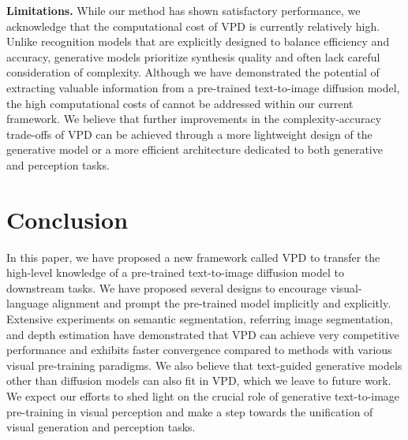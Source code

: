 \documentclass[10pt,twocolumn,letterpaper]{article}
\newcommand{\epstheta}{}
\newcommand{\paragrapha}[2][4pt]{\vspace{#1}\noindent\textbf{#2}}
\begin{document}
\paragrapha{Limitations. } While our method has shown satisfactory performance, we acknowledge that the computational cost of VPD is currently relatively high. Unlike recognition models that are explicitly designed to balance efficiency and accuracy, generative models prioritize synthesis quality and often lack careful consideration of complexity. Although we have demonstrated the potential of extracting valuable information from a pre-trained text-to-image diffusion model, the high computational costs of \epstheta{} cannot be addressed within our current framework. We believe that further improvements in the complexity-accuracy trade-offs of VPD can be achieved through a more lightweight design of the generative model or a more efficient architecture dedicated to both generative and perception tasks.



\section{Conclusion}
In this paper, we have proposed a new framework called VPD to transfer the high-level knowledge of a pre-trained text-to-image diffusion model to downstream tasks. We have proposed several designs to encourage visual-language alignment and prompt the pre-trained model implicitly and explicitly. Extensive experiments on semantic segmentation, referring image segmentation, and depth estimation have demonstrated that VPD can achieve very competitive performance and exhibits faster convergence compared to methods with various visual pre-training paradigms. We also believe that text-guided generative models other than diffusion models\cite{saharia2022imagen,ramesh2022dalle2,chang2023muse} can also fit in VPD, which we leave to future work. We expect our efforts to shed light on the crucial role of generative text-to-image pre-training in visual perception and make a step towards the unification of visual generation and perception tasks.

{\small


}
\end{document}
